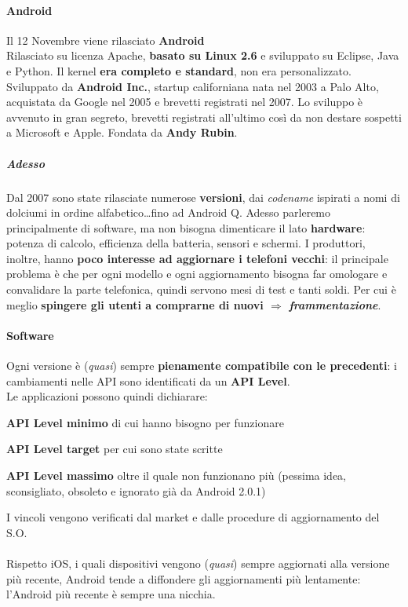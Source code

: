 \documentclass[10pt]{book}
\begin{document}
\paragraph{Android} Il 12 Novembre viene rilasciato \textbf{Android}\\
Rilasciato su licenza Apache, \textbf{basato su Linux 2.6} e sviluppato su Eclipse, Java e Python. Il kernel \textbf{era completo e standard}, non era personalizzato.\\
Sviluppato da \textbf{Android Inc.}, startup californiana nata nel 2003 a Palo Alto, acquistata da Google nel 2005 e brevetti registrati nel 2007. Lo sviluppo è avvenuto in gran segreto, brevetti registrati all'ultimo così da non destare sospetti a Microsoft e Apple. Fondata da \textbf{Andy Rubin}.
\subparagraph{Adesso} Dal 2007 sono state rilasciate numerose \textbf{versioni}, dai \textit{codename} ispirati a nomi di dolciumi in ordine alfabetico\ldots fino ad Android Q. Adesso parleremo principalmente di software, ma non bisogna dimenticare il lato \textbf{hardware}: potenza di calcolo, efficienza della batteria, sensori e schermi. I produttori, inoltre, hanno \textbf{poco interesse ad aggiornare i telefoni vecchi}: il principale problema è che per ogni modello e ogni aggiornamento bisogna far omologare e convalidare la parte telefonica, quindi servono mesi di test e tanti soldi. Per cui è meglio \textbf{spingere gli utenti a comprarne di nuovi $\Rightarrow$ \textit{frammentazione}}.
\paragraph{Software} Ogni versione è (\textit{quasi}) sempre \textbf{pienamente compatibile con le precedenti}: i cambiamenti nelle API sono identificati da un \textbf{API Level}.\\
Le applicazioni possono quindi dichiarare:
\begin{list}{}{}
	\item \textbf{API Level minimo} di cui hanno bisogno per funzionare
	\item \textbf{API Level target} per cui sono state scritte
	\item \textbf{API Level massimo} oltre il quale non funzionano più (pessima idea, sconsigliato, obsoleto e ignorato già da Android 2.0.1)
\end{list}
I vincoli vengono verificati dal market e dalle procedure di aggiornamento del S.O.\\\\
Rispetto iOS, i quali dispositivi vengono (\textit{quasi}) sempre aggiornati alla versione più recente, Android tende a diffondere gli aggiornamenti più lentamente: l'Android più recente è sempre una nicchia.\\
\end{document}
